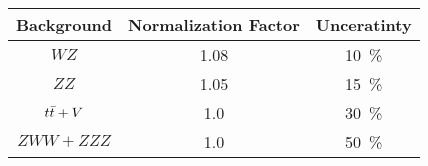     \begin{tabular}{|c|cc|}
    \hline
    Background & Normalization Factor & Unceratinty \\ 
    \hline\hline
    $WZ$ & 1.08 & 10~\% \\
    $ZZ$ & 1.05 & 15~\% \\
    $t\bar{t} +V$ & 1.0 & 30~\% \\
    $ZWW+ZZZ$ & 1.0 & 50~\% \\
    \hline
  \end{tabular}
  
